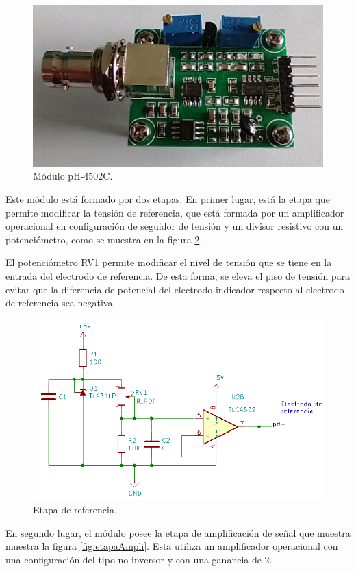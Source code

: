 \begin{figure}[htbp]
	\centering
	\includegraphics[width=.4\textwidth]{./Figures/pH-4502C.jpeg}
	\caption{Módulo pH-4502C.}
	\label{fig:pH-4502C}
\end{figure}

Este módulo está formado por dos etapas.  En primer lugar, está la etapa que permite modificar la tensión de referencia, que está formada por un amplificador operacional en configuración de seguidor de tensión y un divisor resistivo con un potenciómetro, como se muestra en la figura \ref{fig:etReferencia}.

El potenciómetro RV1 permite modificar el nivel de tensión que se tiene en la entrada del electrodo de referencia. De esta forma, se eleva el piso de tensión para evitar que la diferencia de potencial del electrodo indicador respecto al electrodo de referencia sea negativa.

\begin{figure}[htbp]
	\centering
	\includegraphics[width=.8\textwidth]{./Figures/estapaReferencia.png}
	\caption{Etapa de referencia.}
	\label{fig:etReferencia}
\end{figure}

En segundo lugar, el módulo posee la etapa de amplificación de señal que muestra muestra la figura \ref{fig:etapaAmpli}. Esta utiliza un amplificador operacional con una configuración del tipo no inversor y con una ganancia de 2. 

